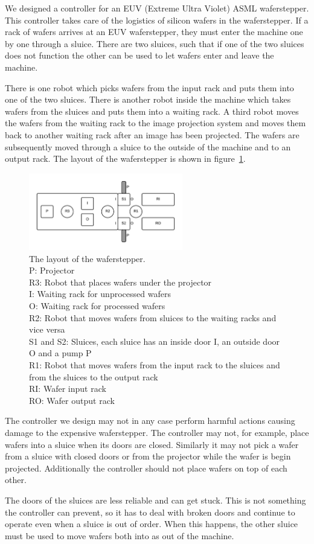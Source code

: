 \cbstart We designed a controller for an EUV (Extreme Ultra Violet) ASML waferstepper. This controller takes care of the logistics of silicon wafers in the waferstepper. If a rack of wafers arrives at an EUV waferstepper, they must enter the machine one by one through a sluice. There are two sluices, such that if one of the two sluices does not function the other can be used to let wafers enter and leave the machine. \cbend

There is one robot which picks wafers from the input rack and puts them into one of the two sluices. There is another robot inside the machine which takes wafers from the sluices and puts them into a waiting rack. A third robot moves the wafers from the waiting rack to the image projection system and moves them back to another waiting rack after an image has been projected. The wafers are subsequently moved through a sluice to the outside of the machine and to an output rack. The layout of the waferstepper is shown in figure~\ref{fig:stepperlayout}.

\begin{figure}[h]
    \centering
	\includegraphics[width=0.6\textwidth]{waferstepper.png}
	\caption{The layout of the waferstepper.\\
	P: Projector\\R3: Robot that places wafers under the projector\\
	I: Waiting rack for unprocessed wafers\\
	O: Waiting rack for processed wafers\\
	R2: Robot that moves wafers from sluices to the waiting racks and vice versa\\
	S1 and S2: Sluices, each sluice has an inside door I, an outside door O and a pump P\\
	R1: Robot that moves wafers from the input rack to the sluices and from the sluices to the output rack\\
	RI: Wafer input rack\\
	RO: Wafer output rack}
	\label{fig:stepperlayout}
\end{figure}

\cbstart
The controller we design may not in any case perform harmful actions causing damage to the expensive waferstepper. The controller may not, for example, place wafers into a sluice when its doors are closed. Similarly it may not pick a wafer from a sluice with closed doors or from the projector while the wafer is begin projected. Additionally the controller should not place wafers on top of each other.

The doors of the sluices are less reliable and can get stuck. This is not something the controller can prevent, so it has to deal with broken doors and continue to operate even when a sluice is out of order. When this happens, the other sluice must be used to move wafers both into as out of the machine.
\cbend